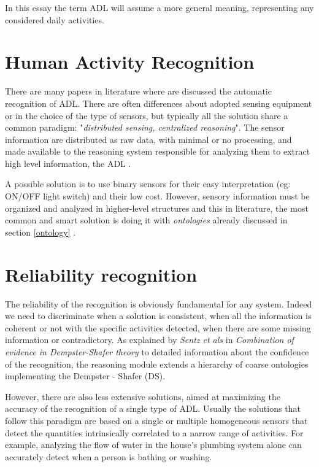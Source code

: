 \documentclass{thesisreport}
\begin{document}
In this essay the term ADL will assume a more general meaning, representing any  considered daily activities. 


\section{Human Activity Recognition}
There are many papers in literature where are discussed the automatic recognition of ADL. There are often differences about adopted sensing equipment or in the choice of the type of sensors, but typically all the solution share a common paradigm: "\textit{distributed sensing, centralized reasoning}". The sensor information are distributed as raw data, with minimal or no processing, and made available to the reasoning system responsible for analyzing them to extract high level information, the ADL \cite{buoncompagni2017towards}.   

A possible solution is to use binary sensors for their easy interpretation (eg: ON/OFF light switch) and their low cost. However, sensory information must be organized and analyzed in higher-level structures and this in literature, the most common and smart solution is doing it with \textit{ontologies}  already discussed in section \ref{ontology} \cite{buoncompagni2017towards}.

\section{Reliability recognition}
The reliability of the recognition is obviously fundamental for any system. Indeed we need to discriminate when a solution is consistent, when all the information is coherent or not with the specific activities detected, when there are some missing information or contradictory.
As explained by \textit{Sentz et als} in \textit{Combination of evidence in Dempster-Shafer theory} \cite{sentz2002combination} to detailed information about the confidence of the recognition, the reasoning module extends a hierarchy of coarse ontologies implementing the Dempster - Shafer (DS). 

However, there are also less extensive solutions, aimed at maximizing the accuracy of the recognition of a single type of ADL. Usually the solutions that follow this paradigm are based on a single or multiple homogeneous sensors that detect the quantities intrinsically correlated to a narrow range of activities. For example, analyzing the flow of water in the house's plumbing system alone can accurately detect when a person is bathing or washing.
\end{document}
